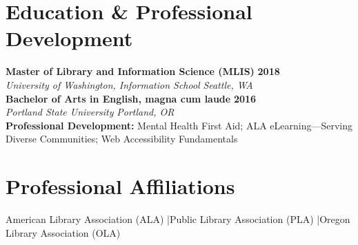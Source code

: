 \documentclass[10pt,letterpaper]{article}
\begin{document}
\section*{Education \& Professional Development}
\textbf{Master of Library and Information Science (MLIS)} \hfill \textbf{2018}\\[-1pt]
\textit{University of Washington, Information School} \hfill \textit{Seattle, WA}\\[2pt]
\textbf{Bachelor of Arts in English, magna cum laude} \hfill \textbf{2016}\\[-1pt]
\textit{Portland State University} \hfill \textit{Portland, OR}\\[3pt]
\textbf{Professional Development:} Mental Health First Aid; ALA eLearning---Serving Diverse Communities; Web Accessibility Fundamentals

\section*{Professional Affiliations}
American Library Association (ALA) \enspace\textcolor{rulecolor}{|}\enspace Public Library Association (PLA) \enspace\textcolor{rulecolor}{|}\enspace Oregon Library Association (OLA)
\end{document}
